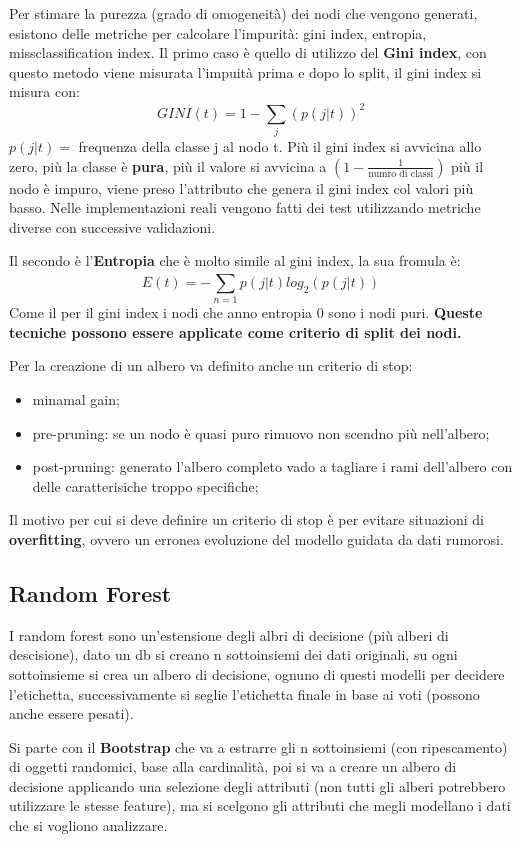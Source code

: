 \documentclass[12pt]{article}
\begin{document}
Per stimare la purezza (grado di omogeneit\`a) dei nodi che vengono generati, esistono delle metriche per calcolare l'impurit\`a: gini index, entropia, missclassification index. Il primo caso \`e quello di utilizzo del \textbf{Gini index}, con questo metodo viene misurata l'impuit\`a prima e dopo lo split, il gini index si misura con:
\[ GINI(t) = 1 - \sum_{j}^{} (p(j|t))^{2} \]
$p(j|t) = $ frequenza della classe j al nodo t. Pi\`u il gini index si avvicina allo zero, pi\`u la classe \`e \textbf{pura}, pi\`u il valore si avvicina a $(1 - \frac{1}{\text{numro di classi}} )$ pi\`u il nodo \`e impuro, viene preso l'attributo che genera il gini index col valori pi\`u basso. Nelle implementazioni reali vengono fatti dei test utilizzando metriche diverse con successive validazioni.

Il secondo \`e l'\textbf{Entropia} che \`e molto simile al gini index, la sua fromula \`e:
\[ E(t) = -\sum_{n=1}^{} p(j|t) log_2(p(j|t)) \]
Come il per il gini index i nodi che anno entropia 0 sono i nodi puri. \textbf{Queste tecniche possono essere applicate come criterio di split dei nodi.}


Per la creazione di un albero va definito anche un criterio di stop:
\begin{itemize}
    \item minamal gain;
    \item pre-pruning: se un nodo \`e quasi puro rimuovo non scendno pi\`u nell'albero;
    \item post-pruning: generato l'albero completo vado a tagliare i rami dell'albero con delle caratterisiche troppo specifiche;
\end{itemize}
Il motivo per cui si deve definire un criterio di stop \`e per evitare situazioni di \textbf{overfitting}, ovvero un erronea evoluzione del modello guidata da dati rumorosi.


\subsection{Random Forest}
I random forest sono un'estensione degli albri di decisione (pi\`u alberi di descisione), dato un db si creano n sottoinsiemi dei dati originali, su ogni sottoinsieme si crea un albero di decisione, ognuno di questi modelli per decidere l'etichetta, successivamente si seglie l'etichetta finale in base ai voti (possono anche essere pesati).

Si parte con il \textbf{Bootstrap} che va a estrarre gli n sottoinsiemi (con ripescamento) di oggetti randomici, base alla cardinalit\`a, poi si va a creare un albero di decisione applicando una selezione degli attributi (non tutti gli alberi potrebbero utilizzare le stesse feature), ma si scelgono gli attributi che megli modellano i dati che si vogliono analizzare.
\end{document}
